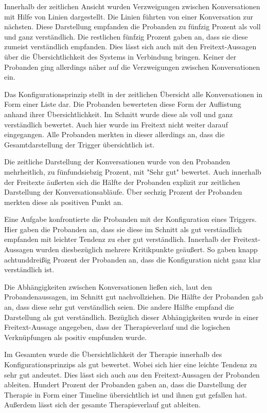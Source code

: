 Innerhalb der zeitlichen Ansicht wurden Verzweigungen zwischen Konversationen mit Hilfe von Linien dargestellt. Die Linien führten von einer Konversation zur nächsten. Diese Darstellung empfanden die Probanden zu fünfzig Prozent als voll und ganz verständlich. Die restlichen fünfzig Prozent gaben an, dass sie diese zumeist verständlich empfanden. Dies lässt sich auch mit den Freitext-Aussagen über die Übersichtlichkeit des Systems in Verbindung bringen. Keiner der Probanden ging allerdings näher auf die Verzweigungen zwischen Konversationen ein.

Das Konfigurationsprinzip stellt in der zeitlichen Übersicht alle Konversationen in Form einer Liste dar. Die Probanden bewerteten diese Form der Auflistung anhand ihrer Übersichtlichkeit. Im Schnitt wurde diese als voll und ganz verständlich bewertet. Auch hier wurde im Freitext nicht weiter darauf eingegangen. Alle Probanden merkten in dieser allerdings an, dass die Gesamtdarstellung der Trigger übersichtlich ist. 

Die zeitliche Darstellung der Konversationen wurde von den Probanden mehrheitlich, zu fünfundsiebzig Prozent, mit "Sehr gut" bewertet. Auch innerhalb der Freitexte äußerten sich die Hälfte der Probanden explizit zur zeitlichen Darstellung der Konversationsabläufe. Über sechzig Prozent der Probanden merkten diese als positiven Punkt an.

Eine Aufgabe konfrontierte die Probanden mit der Konfiguration eines Triggers. Hier gaben die Probanden an, dass sie diese im Schnitt als gut verständlich empfanden mit leichter Tendenz zu eher gut verständlich. Innerhalb der Freitext-Aussagen wurden diesbezüglich mehrere Kritikpunkte geäußert. So gaben knapp achtunddreißig Prozent der Probanden an, dass die Konfiguration nicht ganz klar verständlich ist.

Die Abhängigkeiten zwischen Konversationen ließen sich, laut den Probandenaussagen, im Schnitt gut nachvollziehen. Die Hälfte der Probanden gab an, dass diese sehr gut verständlich seien. Die andere Hälfte empfand die Darstellung als gut verständlich. Bezüglich dieser Abhängigkeiten wurde in einer Freitext-Aussage angegeben, dass der Therapieverlauf und die logischen Verknüpfungen als positiv empfunden wurde. 

Im Gesamten wurde die Übersichtlichkeit der Therapie innerhalb des Konfigurationsprinzips als gut bewertet. Wobei sich hier eine leichte Tendenz zu sehr gut andeutet. Dies lässt sich auch aus den Freitext-Aussagen der Probanden ableiten. Hundert Prozent der Probanden gaben an, dass die Darstellung der Therapie in Form einer Timeline übersichtlich ist und ihnen gut gefallen hat. Außerdem lässt sich der gesamte Therapieverlauf gut ableiten.

